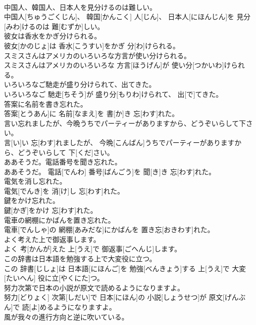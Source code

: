 \documentclass[8pt]{extreport}
\begin{document}
\begin{CJK}{UTF8}{min}
\\	中国人、韓国人、日本人を見分けるのは難しい。	
\\	中国人[ちゅうごくじん]、 韓国[かんこく] 人[じん]、 日本人[にほんじん]を 見分[みわ]けるのは 難[むずか]しい。
\\	彼女は香水をかぎ分けられる。	
\\	彼女[かのじょ]は 香水[こうすい]をかぎ 分[わ]けられる。
\\	スミスさんはアメリカのいろいろな方言が使い分けられる。	
\\	スミスさんはアメリカのいろいろな 方言[ほうげん]が 使い分[つかいわ]けられる。
\\	いろいろなご馳走が盛り分けられて、出てきた。	
\\	いろいろなご 馳走[ちそう]が 盛り分[もりわ]けられて、 出[で]てきた。
\\	答案に名前を書き忘れた。	
\\	答案[とうあん]に 名前[なまえ]を 書[か]き 忘[わす]れた。
\\	言い忘れましたが、今晩うちでパーティーがありますから、どうぞいらして下さい。	
\\	言[い]い 忘[わす]れましたが、 今晩[こんばん]うちでパーティーがありますから、どうぞいらして 下[くだ]さい。
\\	ああそうだ。電話番号を聞き忘れた。	
\\	ああそうだ。 電話[でんわ] 番号[ばんごう]を 聞[き]き 忘[わす]れた。
\\	電気を消し忘れた。	
\\	電気[でんき]を 消[け]し 忘[わす]れた。
\\	鍵をかけ忘れた。	
\\	鍵[かぎ]をかけ 忘[わす]れた。
\\	電車の網棚にかばんを置き忘れた。	
\\	電車[でんしゃ]の 網棚[あみだな]にかばんを 置き忘[おきわす]れた。
\\	よく考えた上で御返事します。	
\\	よく 考[かんが]えた 上[うえ]で 御返事[ごへんじ]します。
\\	この辞書は日本語を勉強する上で大変役に立つ。	
\\	この 辞書[じしょ]は 日本語[にほんご]を 勉強[べんきょう]する 上[うえ]で 大変[たいへん] 役に立[やくにた]つ。
\\	努力次第で日本の小説が原文で読めるようになりますよ。	
\\	努力[どりょく] 次第[しだい]で 日本[にほん]の 小説[しょうせつ]が 原文[げんぶん]で 読[よ]めるようになりますよ。
\\	風が我々の進行方向と逆に吹いている。	

\end{CJK}
\end{document}
